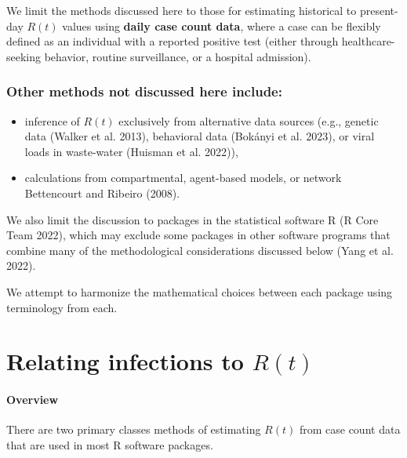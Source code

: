 \documentclass[
  letterpaper,
  DIV=11,
  numbers=noendperiod]{scrreprt}
\providecommand{\tightlist}{%
  \setlength{\itemsep}{0pt}\setlength{\parskip}{0pt}}\usepackage{longtable,booktabs,array}
\begin{document}
We limit the methods discussed here to those for estimating historical
to present-day \(R(t)\) values using \textbf{daily case count data},
where a case can be flexibly defined as an individual with a reported
positive test (either through healthcare-seeking behavior, routine
surveillance, or a hospital admission).

\subsection*{Other methods not discussed here
include:}\label{other-methods-not-discussed-here-include}

\begin{itemize}
\tightlist
\item
  inference of \(R(t)\) exclusively from alternative data sources (e.g.,
  genetic data (Walker et al. 2013), behavioral data (Bokányi et al.
  2023), or viral loads in waste-water (Huisman et al. 2022)),
\item
  calculations from compartmental, agent-based models, or network
  Bettencourt and Ribeiro (2008).
\end{itemize}

We also limit the discussion to packages in the statistical software R
(R Core Team 2022), which may exclude some packages in other software
programs that combine many of the methodological considerations
discussed below (Yang et al. 2022).

We attempt to harmonize the mathematical choices between each package
using terminology from each.

\chapter*{\texorpdfstring{Relating infections to
\(R(t)\)}{Relating infections to R(t)}}\label{relating-infections-to-rt}


\subsubsection*{Overview}\label{overview-1}

There are two primary classes methods of estimating \(R(t)\) from case
count data that are used in most R software packages.
\end{document}
